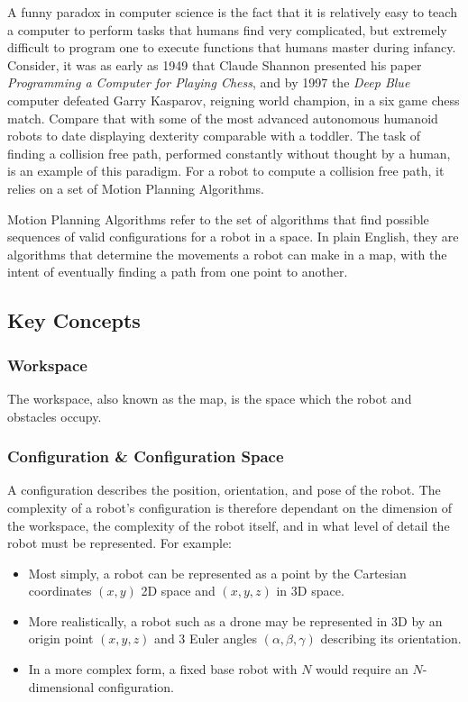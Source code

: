
A funny paradox in computer science is the fact that it is relatively easy to teach a computer to perform tasks that humans find very complicated, but extremely difficult to program one to execute functions that humans master during infancy. Consider, it was as early as 1949 that Claude Shannon presented his paper \textit{Programming a Computer for Playing Chess}\cite{Shannon1950}, and by 1997 the \textit{Deep Blue} computer defeated Garry Kasparov, reigning world champion, in a six game chess match.\cite{Campbell2002} Compare that with some of the most advanced autonomous humanoid robots to date displaying dexterity comparable with a toddler. The task of finding a collision free path, performed constantly without thought by a human, is an example of this paradigm. For a robot to compute a collision free path, it relies on a set of Motion Planning Algorithms.

Motion Planning Algorithms refer to the set of algorithms that find possible sequences of valid \gls{configuration}s for a robot in a space. In plain English, they are algorithms that determine the movements a robot can make in a map, with the intent of eventually finding a path from one point to another. 

\subsection{Key Concepts}
    \subsubsection{Workspace}
    The workspace, also known as the map, is the space which the robot and obstacles occupy. 
    
    \subsubsection{Configuration \& Configuration Space}
    A configuration describes the position, orientation, and pose of the robot. The complexity of a robot's configuration is therefore dependant on the dimension of the workspace, the complexity of the robot itself, and in what level of detail the robot must be represented. For example:
    \begin{itemize}
        \item Most simply, a robot can be represented as a point by the Cartesian coordinates $(x,y)$ \gls{2D} space and $(x,y,z)$ in \gls{3D} space.
        \item More realistically, a robot such as a drone may be represented in \gls{3D} by an origin point $(x,y,z)$ and 3 Euler angles $(\alpha,\beta,\gamma)$ describing its orientation.
        \item In a more complex form, a fixed base robot with $N$  would require an $N$-dimensional configuration.
    \end{itemize}

    


